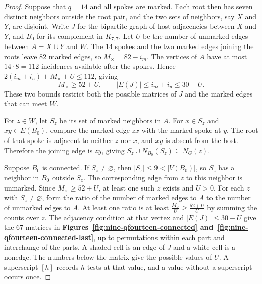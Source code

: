 \documentclass[preprint,11pt,numbers]{elsarticle-arxiv}
\numberwithin{equation}{section}
\theoremstyle{definition}
\begin{document}
\begin{proof}
Suppose that $q=14$ and all spokes are marked. Each root then has
seven distinct neighbors outside the root pair, and the two sets of
neighbors, say $X$ and $Y$, are disjoint. Write $J$ for the bipartite
graph of host adjacencies between $X$ and $Y$, and $B_0$ for its
complement in $K_{7,7}$. Let $U$ be the number of unmarked edges
between $A=X\cup Y$ and $W$. The 14 spokes and the two marked edges
joining the roots leave $82$ marked edges, so $M_\times=82-i_m$. The vertices of
$A$ have at most $14\cdot 8=112$ incidences available after the spokes.
Hence $2(i_m+i_u)+M_\times+U\le112$, giving
\[
 M_\times\geq52+U,\qquad |E(J)|\le i_m+i_u\leq30-U .
\]
These two bounds restrict both the possible matrices of $J$ and the
marked edges that can meet $W$.

For $z\in W$, let $S_z$ be its set of marked neighbors in $A$.
For $x\in S_z$ and $xy\in E(B_0)$, compare the marked edge
$zx$ with the marked spoke at $y$. The root of that spoke is
adjacent to neither $z$ nor $x$, and $xy$ is absent from the
host. Therefore the joining edge is $zy$, giving
$S_z\cup N_{B_0}(S_z)\subseteq N_G(z)$.

Suppose $B_0$ is connected. If $S_z\ne\varnothing$, then
$|S_z|\le9<|V(B_0)|$, so $S_z$ has a neighbor in $B_0$
outside $S_z$. The corresponding edge from $z$ to this neighbor
is unmarked. Since $M_\times\ge52+U$, at least one such $z$
exists and $U>0$. For each $z$ with $S_z\ne\varnothing$, form
the ratio of the number of marked edges to $A$ to the number
of unmarked edges to $A$. At least one ratio is at least
$\frac{M_\times}{U}\ge\frac{52+U}{U}$ by summing the counts
over $z$. The adjacency condition at that vertex and
$|E(J)|\le30-U$ give the 67 matrices in
\textbf{Figures~\ref{fig:nine-qfourteen-connected}
and~\ref{fig:nine-qfourteen-connected-last}}, up to permutations within
each part and interchange of the parts. A shaded cell is an edge of
$J$ and a white cell is a nonedge. The numbers below the matrix give
the possible values of $U$. A superscript $[h]$ records $h$ tests
at that value, and a value without a superscript occurs once.


\end{proof}
\end{document}
